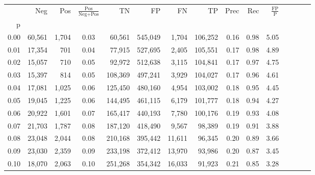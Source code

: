 \begin{tabular}{rrrcrrrrrrrrrrr}
\toprule
{} &     Neg &     Pos & $\frac{\text{Pos}}{\text{Neg}+\text{Pos}}$ &       TN &       FP &       FN &       TP &  Prec &   Rec & $\frac{\text{FP}}{\text{P}}$ \\
p    &         &         &                                            &          &          &          &          &       &       &                              \\
\midrule
0.00 &  60,561 &   1,704 &                                       0.03 &   60,561 &  545,049 &    1,704 &  106,252 &  0.16 &  0.98 &                         5.05 \\
0.01 &  17,354 &     701 &                                       0.04 &   77,915 &  527,695 &    2,405 &  105,551 &  0.17 &  0.98 &                         4.89 \\
0.02 &  15,057 &     710 &                                       0.05 &   92,972 &  512,638 &    3,115 &  104,841 &  0.17 &  0.97 &                         4.75 \\
0.03 &  15,397 &     814 &                                       0.05 &  108,369 &  497,241 &    3,929 &  104,027 &  0.17 &  0.96 &                         4.61 \\
0.04 &  17,081 &   1,025 &                                       0.06 &  125,450 &  480,160 &    4,954 &  103,002 &  0.18 &  0.95 &                         4.45 \\
0.05 &  19,045 &   1,225 &                                       0.06 &  144,495 &  461,115 &    6,179 &  101,777 &  0.18 &  0.94 &                         4.27 \\
0.06 &  20,922 &   1,601 &                                       0.07 &  165,417 &  440,193 &    7,780 &  100,176 &  0.19 &  0.93 &                         4.08 \\
0.07 &  21,703 &   1,787 &                                       0.08 &  187,120 &  418,490 &    9,567 &   98,389 &  0.19 &  0.91 &                         3.88 \\
0.08 &  23,048 &   2,044 &                                       0.08 &  210,168 &  395,442 &   11,611 &   96,345 &  0.20 &  0.89 &                         3.66 \\
0.09 &  23,030 &   2,359 &                                       0.09 &  233,198 &  372,412 &   13,970 &   93,986 &  0.20 &  0.87 &                         3.45 \\
0.10 &  18,070 &   2,063 &                                       0.10 &  251,268 &  354,342 &   16,033 &   91,923 &  0.21 &  0.85 &                         3.28 \\

\end{tabular}
